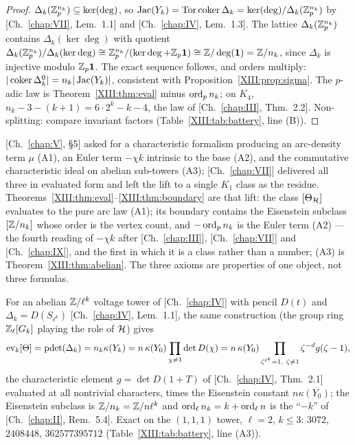 \begin{proof}
$\Delta_k(\mathbb{Z}_p^{n_k})\subseteq\ker(\deg)$, so $\operatorname{Jac}(Y_k)=\operatorname{Tor}\operatorname{coker}\Delta_k=\ker(\deg)/\Delta_k
(\mathbb{Z}_p^{n_k})$ by [Ch.~\ref{chap:VII}, Lem.~1.1] and [Ch.~\ref{chap:IV}, Lem.~1.3]. The lattice $\Delta_k(\mathbb{Z}_p^{n_k})$ contains
$\Delta_k(\ker\deg)$ with quotient $\Delta_k(\mathbb{Z}_p^{n_k})/\Delta_k(\ker\deg)\cong\mathbb{Z}_p^{n_k}/
(\ker\deg+\mathbb{Z}_p\mathbf1)\cong\mathbb{Z}/\deg(\mathbf1)=\mathbb{Z}/n_k$, since $\Delta_k$ is injective modulo
$\mathbb{Z}_p\mathbf1$. The exact sequence follows, and orders multiply: $|\operatorname{coker}\Delta_k^{0}|=n_k
|\operatorname{Jac}(Y_k)|$, consistent with Proposition~\ref{XIII:prop:sigma}. The $p$-adic law is
Theorem~\ref{XIII:thm:eval} minus $\operatorname{ord}_pn_k$; on $K_4$, $n_k-3-(k+1)=6\cdot2^{k}-k-4$, the law of
[Ch.~\ref{chap:III}, Thm.~2.2]. Non-splitting: compare invariant factors (Table~\ref{XIII:tab:battery}, line (B)).
\end{proof}

\begin{remark}\label{XIII:rem:axioms}
[Ch.~\ref{chap:V}, \S5] asked for a characteristic formalism producing an arc-density term $\mu$ (A1), an
Euler term $-\chi k$ intrinsic to the base (A2), and the commutative characteristic ideal on
abelian sub-towers (A3); [Ch.~\ref{chap:VII}] delivered all three in evaluated form and left the lift to a
single $K_1$ class as the residue. Theorems~\ref{XIII:thm:eval}--\ref{XIII:thm:boundary} are that lift:
the class $[\Theta_{\mathcal{H}}]$ evaluates to the pure arc law (A1); its boundary contains the
Eisenstein subclass $[\mathbb{Z}/n_k]$ whose order is the vertex count, and $-\operatorname{ord}_pn_k$ is the Euler
term (A2) --- the fourth reading of $-\chi k$ after [Ch.~\ref{chap:III}], [Ch.~\ref{chap:VII}] and [Ch.~\ref{chap:IX}], and the first in
which it is a class rather than a number; (A3) is Theorem~\ref{XIII:thm:abelian}. The three
axioms are properties of one object, not three formulas.
\end{remark}

\begin{theorem}\label{XIII:thm:abelian}
For an abelian $\mathbb{Z}/\ell^{k}$ voltage tower of {\rm[Ch.~\ref{chap:IV}]} with pencil $D(t)$ and
$\Delta_k=D(S_{\ell^{k}})$ {\rm[Ch.~\ref{chap:IV}, Lem.~1.1]}, the same construction (the group ring
$\mathbb{Z}_\ell[G_k]$ playing the role of $\mathcal{H}$) gives
\[
\ev_k[\Theta]=\pdet(\Delta_k)=n_k\kappa(Y_k)=n\,\kappa(Y_0)\prod_{\chi\ne1}\det D(\chi)
=n\,\kappa(Y_0)\prod_{\zeta^{\ell^{k}}=1,\ \zeta\ne1}\zeta^{-d}g(\zeta-1),
\]
the characteristic element $g=\det D(1+T)$ of {\rm[Ch.~\ref{chap:IV}, Thm.~2.1]} evaluated at all
nontrivial characters, times the Eisenstein constant $n\kappa(Y_0)$; the Eisenstein
subclass is $\mathbb{Z}/n_k=\mathbb{Z}/n\ell^{k}$ and $\operatorname{ord}_\ell n_k=k+\operatorname{ord}_\ell n$ is the ``$-k$'' of
{\rm[Ch.~\ref{chap:II}, Rem.~5.4]}. Exact on the $(1,1,1)$ tower, $\ell=2$, $k\le3$: $3072$, $2408448$,
$362577395712$ (Table~\ref{XIII:tab:battery}, line (A3)).
\end{theorem}

